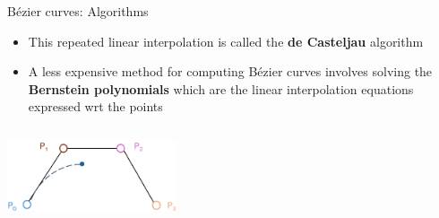 \begin{frame}{B\'ezier curves: Algorithms}
    \begin{itemize}
        \item This repeated linear interpolation is called the \textbf{de Casteljau} algorithm \vspace{0.2em}
        \item A less expensive method for computing B\'ezier curves involves solving the \textbf{Bernstein polynomials} which are the linear interpolation equations expressed wrt the points
    \end{itemize}
    \begin{columns}
            \begin{column}{5cm}
                 \begin{center}
                    \includegraphics[width=5cm]{contents/images/cubic_bernstein}
                \end{center}
            \end{column}
            \begin{column}{2.5cm}
                \begin{center}
\end{center}
\end{column}
\end{columns}
\end{frame}
